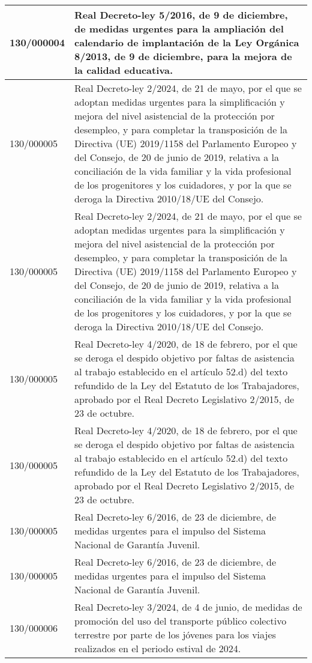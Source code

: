 {\begin{table}[H]
\begin{center}
\begin{tabularx}{\linewidth}{| l | X |}
\hline
130/000004 & Real Decreto-ley 5/2016, de 9 de diciembre, de medidas urgentes para la ampliación del calendario de implantación de la Ley Orgánica 8/2013, de 9 de diciembre, para la mejora de la calidad educativa. \\
\hline
130/000005 & Real Decreto-ley 2/2024, de 21 de mayo, por el que se adoptan medidas urgentes para la simplificación y mejora del nivel asistencial de la protección por desempleo, y para completar la transposición de la Directiva (UE) 2019/1158 del Parlamento Europeo y del Consejo, de 20 de junio de 2019, relativa a la conciliación de la vida familiar y la vida profesional de los progenitores y los cuidadores, y por la que se deroga la Directiva 2010/18/UE del Consejo. \\
\hline
130/000005 & Real Decreto-ley 2/2024, de 21 de mayo, por el que se adoptan medidas urgentes para la simplificación y mejora del nivel asistencial de la protección por desempleo, y para completar la transposición de la Directiva (UE) 2019/1158 del Parlamento Europeo y del Consejo, de 20 de junio de 2019, relativa a la conciliación de la vida familiar y la vida profesional de los progenitores y los cuidadores, y por la que se deroga la Directiva 2010/18/UE del Consejo. \\
\hline
130/000005 & Real Decreto-ley 4/2020, de 18 de febrero, por el que se deroga el despido objetivo por faltas de asistencia al trabajo establecido en el artículo 52.d) del texto refundido de la Ley del Estatuto de los Trabajadores, aprobado por el Real Decreto Legislativo 2/2015, de 23 de octubre. \\
\hline
130/000005 & Real Decreto-ley 4/2020, de 18 de febrero, por el que se deroga el despido objetivo por faltas de asistencia al trabajo establecido en el artículo 52.d) del texto refundido de la Ley del Estatuto de los Trabajadores, aprobado por el Real Decreto Legislativo 2/2015, de 23 de octubre. \\
\hline
130/000005 & Real Decreto-ley 6/2016, de 23 de diciembre, de medidas urgentes para el impulso del Sistema Nacional de Garantía Juvenil. \\
\hline
130/000005 & Real Decreto-ley 6/2016, de 23 de diciembre, de medidas urgentes para el impulso del Sistema Nacional de Garantía Juvenil. \\
\hline
130/000006 & Real Decreto-ley 3/2024, de 4 de junio, de medidas de promoción del uso del transporte público colectivo terrestre por parte de los jóvenes para los viajes realizados en el periodo estival de 2024. \\

\end{tabularx}
\end{center}
\end{table}}
